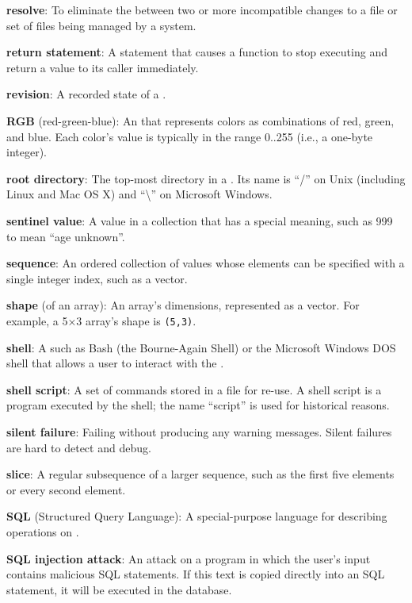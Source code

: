 \documentclass{book}
\begin{document}
\textbf{resolve}: To eliminate the 
between two or more incompatible changes to a file or set of files being
managed by a  system.

\textbf{return statement}: A statement that causes a function to stop
executing and return a value to its caller immediately.

\textbf{revision}: A recorded state of a
.

\textbf{RGB} (red-green-blue): An
 that represents colors
as combinations of red, green, and blue. Each color's value is typically
in the range 0..255 (i.e., a one-byte integer).

\textbf{root directory}: The top-most directory in a
. Its name is ``/'' on Unix
(including Linux and Mac OS X) and ``\textbackslash{}'' on Microsoft
Windows.

\textbf{sentinel value}: A value in a collection that has a special
meaning, such as 999 to mean ``age unknown''.

\textbf{sequence}: An ordered collection of values whose elements can be
specified with a single integer index, such as a vector.

\textbf{shape} (of an array): An array's dimensions, represented as a
vector. For example, a 5×3 array's shape is \texttt{(5,3)}.

\textbf{shell}: A  such as Bash
(the Bourne-Again Shell) or the Microsoft Windows DOS shell that allows
a user to interact with the .

\textbf{shell script}: A set of  commands
stored in a file for re-use. A shell script is a program executed by the
shell; the name ``script'' is used for historical reasons.

\textbf{silent failure}: Failing without producing any warning messages.
Silent failures are hard to detect and debug.

\textbf{slice}: A regular subsequence of a larger sequence, such as the
first five elements or every second element.

\textbf{SQL} (Structured Query Language): A special-purpose language for
describing operations on .

\textbf{SQL injection attack}: An attack on a program in which the
user's input contains malicious SQL statements. If this text is copied
directly into an SQL statement, it will be executed in the database.
\end{document}

